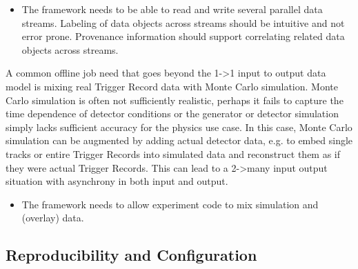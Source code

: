 \documentclass[../main-v1.tex]{subfiles}
\begin{document}
\begin{itemize}
\item The framework needs to be able to read and write several parallel data streams.  Labeling of data objects across streams should be intuitive and not error prone.  Provenance information should support correlating related data objects across streams.

\end{itemize}

A common offline job need that goes beyond the 1->1 input to output data model is mixing real Trigger Record data with Monte Carlo simulation.  Monte Carlo simulation is often not sufficiently realistic, perhaps it fails to capture the time dependence of detector conditions or the generator or detector simulation simply lacks sufficient accuracy for the physics use case.  In this case, Monte Carlo simulation can be augmented by adding actual detector data, e.g. to embed single tracks or entire Trigger Records into simulated data and reconstruct them as if they were actual Trigger Records.  This can lead to a 2->many input output situation with asynchrony in both input and output. 

\begin{itemize}
\item The framework needs to allow experiment code to mix simulation and (overlay) data.

\end{itemize}







\subsection{Reproducibility and Configuration}
\end{document}
